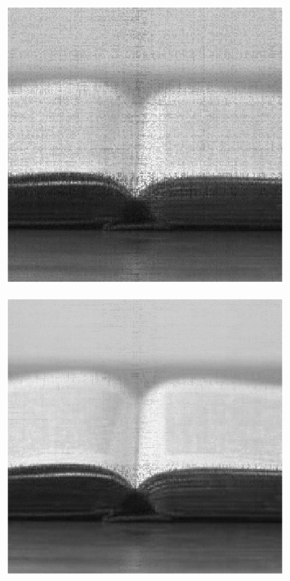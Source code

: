 \begin{figure}
    \begin{subfigure}{0.325\linewidth}
        \includegraphics[width=\linewidth]{Poglavja/Slike/kompleksnost/preprosta grayscale 300/rez35SVT.png}
    \end{subfigure}
    \hfill
    \begin{subfigure}{0.325\linewidth}
        \includegraphics[width=\linewidth]{Poglavja/Slike/kompleksnost/preprosta grayscale 300/rez45SVT.png}

\end{subfigure}
\end{figure}
